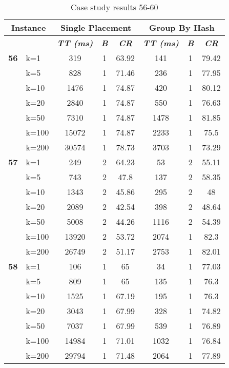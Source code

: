     \begin{table}[htbp]
    \caption{Case study results 56-60}
    \centering
    \begin{tabular}{|l|l|c|c|c|c|c|c|}
    \hline
    \multicolumn{ 2}{|c|}{\textbf{Instance}} & \multicolumn{ 3}{c|}{\textbf{Single Placement}} & \multicolumn{ 3}{c|}{\textbf{Group By Hash}} \\ \hline
    \multicolumn{ 2}{|l|}{} & \textbf{\textit{TT (ms)}} & \textbf{\textit{B}} & \textbf{\textit{CR}} & \textbf{\textit{TT (ms)}} & \textbf{\textit{B}} & \textbf{\textit{CR}} \\ \hline
    \multicolumn{1}{|r|}{\textbf{56}} & k=1 & 319 & 1 & 63.92 & 141 & 1 & 79.42 \\ 
     & k=5 & 828 & 1 & 71.46 & 236 & 1 & 77.95 \\ 
     & k=10 & 1476 & 1 & 74.87 & 420 & 1 & 80.12 \\ 
     & k=20 & 2840 & 1 & 74.87 & 550 & 1 & 76.63 \\ 
     & k=50 & 7310 & 1 & 74.87 & 1478 & 1 & 81.85 \\ 
     & k=100 & 15072 & 1 & 74.87 & 2233 & 1 & 75.5 \\ 
     & k=200 & 30574 & 1 & 78.73 & 3703 & 1 & 73.29 \\ \hline
    \multicolumn{1}{|r|}{\textbf{57}} & k=1 & 249 & 2 & 64.23 & 53 & 2 & 55.11 \\ 
     & k=5 & 743 & 2 & 47.8 & 137 & 2 & 58.35 \\ 
     & k=10 & 1343 & 2 & 45.86 & 295 & 2 & 48 \\ 
     & k=20 & 2089 & 2 & 42.54 & 398 & 2 & 48.64 \\ 
     & k=50 & 5008 & 2 & 44.26 & 1116 & 2 & 54.39 \\ 
     & k=100 & 13920 & 2 & 53.72 & 2074 & 1 & 82.3 \\ 
     & k=200 & 26749 & 2 & 51.17 & 2753 & 1 & 82.01 \\ \hline
    \multicolumn{1}{|r|}{\textbf{58}} & k=1 & 106 & 1 & 65 & 34 & 1 & 77.03 \\ 
     & k=5 & 809 & 1 & 65 & 135 & 1 & 76.3 \\ 
     & k=10 & 1525 & 1 & 67.19 & 195 & 1 & 76.3 \\ 
     & k=20 & 3043 & 1 & 67.99 & 328 & 1 & 74.82 \\ 
     & k=50 & 7037 & 1 & 67.99 & 539 & 1 & 76.89 \\ 
     & k=100 & 14984 & 1 & 71.01 & 1032 & 1 & 76.84 \\ 
     & k=200 & 29794 & 1 & 71.48 & 2064 & 1 & 77.89 \\ \hline

\end{tabular}
\end{table}
